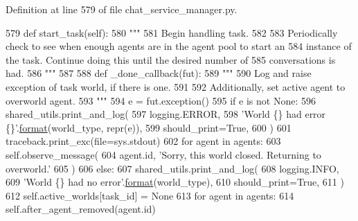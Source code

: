 Definition at line 579 of file chat\+\_\+service\+\_\+manager.\+py.


\begin{DoxyCode}
579     \textcolor{keyword}{def }start\_task(self):
580         \textcolor{stringliteral}{"""}
581 \textcolor{stringliteral}{        Begin handling task.}
582 \textcolor{stringliteral}{}
583 \textcolor{stringliteral}{        Periodically check to see when enough agents are in the agent pool to start an}
584 \textcolor{stringliteral}{        instance of the task. Continue doing this until the desired number of}
585 \textcolor{stringliteral}{        conversations is had.}
586 \textcolor{stringliteral}{        """}
587 
588         \textcolor{keyword}{def }\_done\_callback(fut):
589             \textcolor{stringliteral}{"""}
590 \textcolor{stringliteral}{            Log and raise exception of task world, if there is one.}
591 \textcolor{stringliteral}{}
592 \textcolor{stringliteral}{            Additionally, set active agent to overworld agent.}
593 \textcolor{stringliteral}{            """}
594             e = fut.exception()
595             \textcolor{keywordflow}{if} e \textcolor{keywordflow}{is} \textcolor{keywordflow}{not} \textcolor{keywordtype}{None}:
596                 shared\_utils.print\_and\_log(
597                     logging.ERROR,
598                     \textcolor{stringliteral}{'World \{\} had error \{\}'}.\hyperlink{namespaceparlai_1_1chat__service_1_1services_1_1messenger_1_1shared__utils_a32e2e2022b824fbaf80c747160b52a76}{format}(world\_type, repr(e)),
599                     should\_print=\textcolor{keyword}{True},
600                 )
601                 traceback.print\_exc(file=sys.stdout)
602                 \textcolor{keywordflow}{for} agent \textcolor{keywordflow}{in} agents:
603                     self.observe\_message(
604                         agent.id, \textcolor{stringliteral}{'Sorry, this world closed. Returning to overworld.'}
605                     )
606             \textcolor{keywordflow}{else}:
607                 shared\_utils.print\_and\_log(
608                     logging.INFO,
609                     \textcolor{stringliteral}{'World \{\} had no error'}.\hyperlink{namespaceparlai_1_1chat__service_1_1services_1_1messenger_1_1shared__utils_a32e2e2022b824fbaf80c747160b52a76}{format}(world\_type),
610                     should\_print=\textcolor{keyword}{True},
611                 )
612             self.active\_worlds[task\_id] = \textcolor{keywordtype}{None}
613             \textcolor{keywordflow}{for} agent \textcolor{keywordflow}{in} agents:
614                 self.after\_agent\_removed(agent.id)

\end{DoxyCode}
